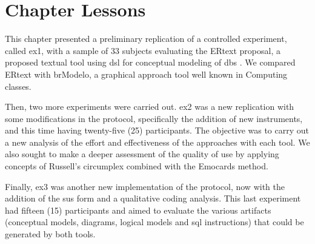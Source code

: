 \section{Chapter Lessons}
\label{sec_experiments:lessons}

This chapter presented a preliminary replication of a controlled experiment, called \ac{ex1}, with a sample of 33 subjects evaluating the ERtext proposal, a proposed textual tool using \ac{dsl} for conceptual modeling of \acp{db} .
We compared ERtext with brModelo, a graphical approach tool well known in Computing classes.

Then, two more experiments were carried out.
\ac{ex2} was a new replication with some modifications in the protocol, specifically the addition of new instruments, and this time having twenty-five (25) participants.
The objective was to carry out a new analysis of the effort and effectiveness of the approaches with each tool.
We also sought to make a deeper assessment of the quality of use by applying concepts of Russell's circumplex combined with the Emocards method.

Finally, \ac{ex3} was another new implementation of the protocol, now with the addition of the \ac{sus} form and a qualitative coding analysis.
This last experiment had fifteen (15) participants and aimed to evaluate the various artifacts (conceptual models, diagrams, logical models and \ac{sql} instructions) that could be generated by both tools.

